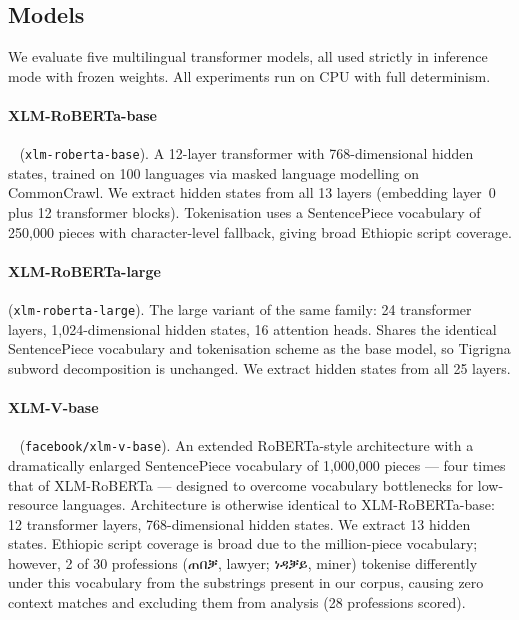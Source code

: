 \documentclass[11pt,a4paper]{article}
\begin{document}
\subsection{Models}

We evaluate five multilingual transformer models, all used strictly in inference
mode with frozen weights. All experiments run on CPU with full determinism.

\paragraph{XLM-RoBERTa-base}~\cite{conneau2020xlm} (\texttt{xlm-roberta-base}).
A 12-layer transformer with 768-dimensional hidden states, trained on 100
languages via masked language modelling on CommonCrawl. We extract hidden states
from all 13 layers (embedding layer~0 plus 12 transformer blocks).
Tokenisation uses a SentencePiece vocabulary of 250{,}000 pieces with
character-level fallback, giving broad Ethiopic script coverage.

\paragraph{XLM-RoBERTa-large} (\texttt{xlm-roberta-large}).
The large variant of the same family: 24 transformer layers, 1{,}024-dimensional
hidden states, 16 attention heads. Shares the identical SentencePiece vocabulary
and tokenisation scheme as the base model, so Tigrigna subword decomposition
is unchanged. We extract hidden states from all 25 layers.

\paragraph{XLM-V-base}~\cite{liang2023xlmv} (\texttt{facebook/xlm-v-base}).
An extended RoBERTa-style architecture with a dramatically enlarged SentencePiece
vocabulary of 1{,}000{,}000 pieces — four times that of XLM-RoBERTa — designed
to overcome vocabulary bottlenecks for low-resource languages. Architecture is
otherwise identical to XLM-RoBERTa-base: 12 transformer layers, 768-dimensional
hidden states. We extract 13 hidden states. Ethiopic script coverage is broad
due to the million-piece vocabulary; however, 2 of 30 professions
({\ethiopicfont ጠበቓ}, lawyer; {\ethiopicfont ነዳቓይ}, miner) tokenise differently
under this vocabulary from the substrings present in our corpus, causing zero
context matches and excluding them from analysis (28 professions scored).
\end{document}
